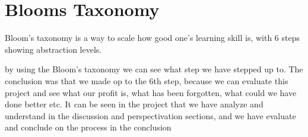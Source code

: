\section{Blooms Taxonomy}
Bloom's taxonomy is a way to scale how good one's learning skill is, with 6 steps showing abstraction levels.

by using the Bloom's taxonomy we can see what step we have stepped up to. The conclusion was that we made op to the 6th step, because we can evaluate this project and see what our profit is, what has been forgotten, what could we have done better etc. It can be seen in the project that we have analyze and understand in the discussion and perspectivation sections, and we have evaluate and conclude on the process in the conclusion